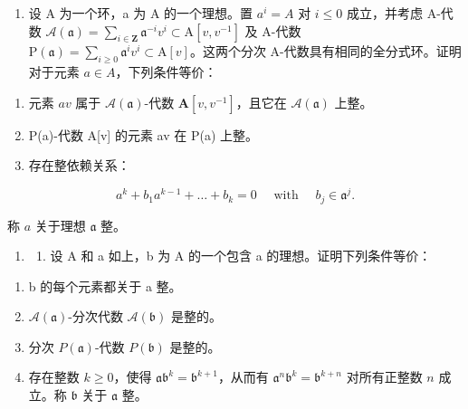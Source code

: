\begin{enumerate}
\def\labelenumi{\arabic{enumi})}
\setcounter{enumi}{7}
\tightlist
\item
  设 A 为一个环，a 为 A 的一个理想。置 \(a^{i} = A\) 对 \(i \leqslant 0\) 成立，并考虑 A-代数 \(\mathcal{A}(\mathfrak{a}) = \sum_{i \in \mathbf{Z}} \mathfrak{a}^{-i} v^{i} \subset \mathrm{A}[v, v^{-1}]\) 及 A-代数 \(\mathrm{P}(\mathfrak{a}) = \sum_{i \geqslant 0} \mathfrak{a}^{i} v^{i} \subset \mathrm{A}[v]\)。这两个分次 A-代数具有相同的全分式环。证明对于元素 \(a \in A\)，下列条件等价：
\end{enumerate}

\begin{enumerate}
\def\labelenumi{(\roman{enumi})}
\item
  元素 \(av\) 属于 \(\mathcal{A}(\mathfrak{a})\)-代数 \(\mathbf{A}[v, v^{-1}]\)，且它在 \(\mathcal{A}(\mathfrak{a})\) 上整。
\item
  P(a)-代数 A{[}v{]} 的元素 av 在 P(a) 上整。
\item
  存在整依赖关系：
\end{enumerate}

\[
a ^ {k} + b _ {1} a ^ {k - 1} + \dots + b _ {k} = 0 \quad \text { with } \quad b _ {j} \in \mathfrak {a} ^ {j}.
\]

称 \(a\) 关于理想 \(\mathfrak{a}\) 整。

\begin{enumerate}
\def\labelenumi{\arabic{enumi})}
\setcounter{enumi}{8}
\tightlist
\item
  \begin{enumerate}
  \def\labelenumii{\alph{enumii})}
  \tightlist
  \item
    设 A 和 a 如上，b 为 A 的一个包含 a 的理想。证明下列条件等价：
  \end{enumerate}
\end{enumerate}

\begin{enumerate}
\def\labelenumi{(\roman{enumi})}
\item
  b 的每个元素都关于 a 整。
\item
  \(\mathcal{A}(\mathfrak{a})\)-分次代数 \(\mathcal{A}(\mathfrak{b})\) 是整的。
\item
  分次 \(P(\mathfrak{a})\)-代数 \(P(\mathfrak{b})\) 是整的。
\item
  存在整数 \(k \geqslant 0\)，使得 \(\mathfrak{a}\mathfrak{b}^{k} = \mathfrak{b}^{k+1}\)，从而有 \(\mathfrak{a}^{n}\mathfrak{b}^{k} = \mathfrak{b}^{k+n}\) 对所有正整数 \(n\) 成立。称 \(\mathfrak{b}\) 关于 \(\mathfrak{a}\) 整。
\end{enumerate}

